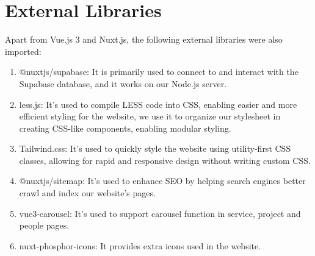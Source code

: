 
\section{External Libraries}
Apart from Vue.js 3 and Nuxt.js, the following external libraries were also imported:
\begin{enumerate}
	\item @nuxtjs/supabase: It is primarily used to connect to and interact with the Supabase database, and it works on our Node.js server.
	\item less.js: It's used to compile LESS code into CSS, enabling easier and more efficient styling for the website, we use it to organize our stylesheet in creating CSS-like components, enabling modular styling.
	\item Tailwind.css: It's used to quickly style the website using utility-first CSS classes, allowing for rapid and responsive design without writing custom CSS.
	\item @nuxtjs/sitemap: It's used to enhance SEO by helping search engines better crawl and index our website's pages.
	\item vue3-carousel: It's used to support carousel function in service, project and people pages.
	\item nuxt-phosphor-icons: It provides extra icons used in the website.
\end{enumerate}